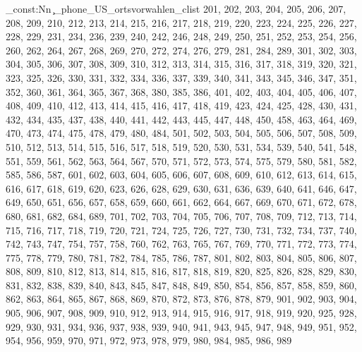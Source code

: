 \clist_const:Nn \c_phone_US_ortsvorwahlen_clist {201,
202,
203,
204,
205,
206,
207,
208,
209,
210,
212,
213,
214,
215,
216,
217,
218,
219,
220,
223,
224,
225,
226,
227, %
228,
229,
231,
234,
236,
239,
240,
242,
246,
248,
249,
250,
251,
252,
253,
254,
256,
260,
262,
264,
267,
268,
269,
270,
272,
274, %
276,
279,
281,
284,
289,
301,
302,
303,
304,
305,
306,
307,
308,
309,
310,
312,
313,
314,
315,
316,
317,
318,
319,
320,
321,
323,
325,
326,
330,
331,
332,
334,
336,
337,
339,
340,
341,
343,
345,
346,
347,
351,
352,
360,
361,
364,
365,
367,
368, %
380,
385,
386,
401,
402,
403,
404,
405,
406,
407,
408,
409,
410,
412,
413,
414,
415,
416,
417,
418,
419,
423,
424,
425,
428, %
430,
431,
432,
434,
435,
437,
438,
440,
441,
442,
443,
445,
447,
448,
450,
458,
463,
464, %
469,
470,
473,
474, %
475,
478,
479,
480,
484,
501,
502,
503,
504,
505,
506,
507,
508,
509,
510,
512,
513,
514,
515,
516,
517,
518,
519,
520,
530,
531,
534,
539,
540,
541,
548,
551,
559,
561,
562,
563,
564,
567,
570,
571,
572,
573,
574,
575,
579,
580,
581,
582,
585,
586,
587,
601,
602,
603,
604,
605,
606,
607,
608,
609,
610,
612,
613,
614,
615,
616,
617,
618,
619,
620,
623,
626,
628,
629,
630,
631,
636,
639,
640,
641,
646,
647,
649,
650,
651,
656, %
657,
658,
659,
660,
661,
662,
664,
667,
669,
670,
671,
672,
678,
680,
681,
682,
684,
689,
701,
702,
703,
704,
705,
706,
707,
708,
709,
712,
713,
714,
715,
716,
717,
718,
719,
720,
721,
724,
725,
726,
727,
730, %
731,
732,
734,
737,
740,
742, %
743,
747,
754,
757,
758,
760,
762,
763,
765,
767,
769,
770,
771, %
772,
773,
774,
775,
778,
779,
780,
781,
782,
784,
785,
786,
787,
801,
802,
803,
804,
805,
806,
807,
808,
809,
810,
812,
813,
814,
815,
816,
817,
818,
819,
820,
825,
826, %
828,
829,
830,
831,
832,
838,
839,
840,
843,
845,
847,
848,
849,
850,
854,
856,
857,
858,
859,
860,
862,
863,
864,
865,
867,
868,
869,
870,
872,
873,
876,
878,
879, %
901,
902,
903,
904,
905,
906,
907,
908,
909,
910,
912,
913,
914,
915,
916,
917,
918,
919,
920,
925,
928,
929,
930,
931,
934,
936,
937,
938,
939,
940,
941,
943, %
945,
947,
948, %
949,
951,
952,
954,
956,
959,
970,
971,
972,
973,
978,
979,
980,
984,
985,
986,
989}
